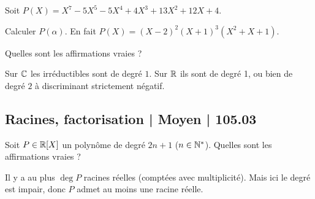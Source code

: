 \begin{question}
Soit $P(X) = X^7 - 5 X^5 - 5 X^4 + 4 X^3 + 13 X^2 + 12 X + 4$.
\begin{answers}


    
    
\end{answers}
\begin{explanations}
Calculer $P(\alpha)$. En fait $P(X) = (X-2)^2(X+1)^3(X^2+X+1)$.
\end{explanations}
\end{question}



\begin{question}
Quelles sont les affirmations vraies ?
\begin{answers}



\end{answers}
\begin{explanations}
Sur $\mathbb{C}$ les irréductibles sont de degré $1$. Sur $\mathbb{R}$ ils sont de degré 1, ou bien de degré $2$ à discriminant strictement négatif.
\end{explanations}
\end{question}



\subsection{Racines, factorisation | Moyen | 105.03}


\begin{question}
Soit $P \in \mathbb{R}[X]$ un polynôme de degré $2n+1$ ($n\in\mathbb{N}^*$).
Quelles sont les affirmations vraies ?
\begin{answers}



\end{answers}
\begin{explanations}
Il y a au plus $\deg P$ racines réelles (comptées avec multiplicité). Mais ici le degré est impair, donc $P$ admet au moins une racine réelle.
\end{explanations}
\end{question}


